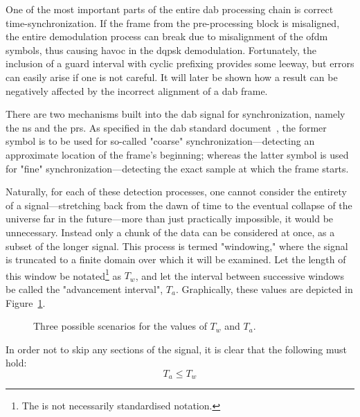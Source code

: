 \documentclass[class=report,11pt,crop=false]{standalone}
\begin{document}
One of the most important parts of the entire \gls{dab} processing chain is correct time-synchronization. If the frame from the pre-processing block is misaligned, the entire demodulation process can break due to misalignment of the \gls{ofdm} symbols, thus causing havoc in the \gls{dqpsk} demodulation. Fortunately, the inclusion of a guard interval with cyclic prefixing provides some leeway, but errors can easily arise if one is not careful. It will later be shown how a result can be negatively affected by the incorrect alignment of a \gls{dab} frame.

There are two mechanisms built into the \gls{dab} signal for synchronization, namely the \gls{ns} and the \gls{prs}. As specified in the \gls{dab} standard document~\cite{dabstandard}, the former symbol is to be used for so-called "coarse" synchronization---detecting an approximate location of the frame's beginning; whereas the latter symbol is used for "fine" synchronization---detecting the exact sample at which the frame starts. 

Naturally, for each of these detection processes, one cannot consider the entirety of a signal---stretching back from the dawn of time to the eventual collapse of the universe far in the future---more than just practically impossible, it would be unnecessary. Instead only a chunk of the data can be considered at once, as a subset of the longer signal. This process is termed "windowing," where the signal is truncated to a finite domain over which it will be examined. Let the length of this window be notated\footnote{The is not necessarily standardised notation.} as \(T_w\), and let the interval between successive windows be called the "advancement interval", \(T_a\). Graphically, these values are depicted in Figure~\ref{fig:window_advance_illustration}.

\begin{figure}[htbp]
  \centering
  \captionsetup{type=figure}
  \def\svgwidth{\linewidth}
  { %
      }
      \caption{Three possible scenarios for the values of \(T_w\) and \(T_a\).}
      \label{fig:window_advance_illustration}
\end{figure}

In order not to skip any sections of the signal, it is clear that the following must hold:
\begin{equation}
  T_a \le T_w
\end{equation}
\end{document}
